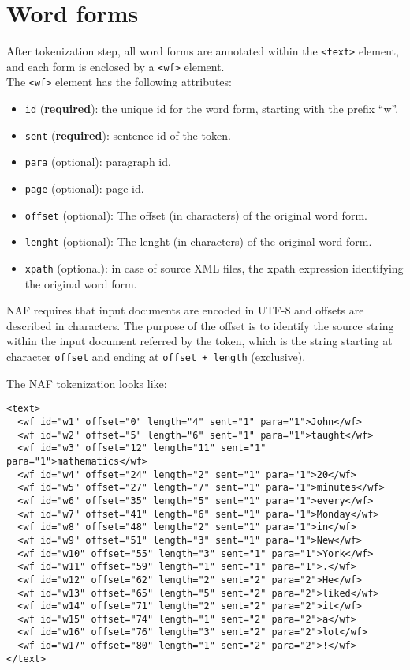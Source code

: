 
\section{Word forms}
\label{sec:word-forms}

After tokenization step, all word forms are annotated within the
\texttt{<text>} element, and each form is enclosed by a \texttt{<wf>}
element.\\

The \texttt{<wf>} element has the following attributes:
\begin{itemize}
\item \texttt{id} (\textbf{required}): the unique id for the word form,
  starting with the prefix ``w''.
\item \texttt{sent} (\textbf{required}): sentence id of the token.
\item \texttt{para} (optional): paragraph id.
\item \texttt{page} (optional): page id.
\item \texttt{offset} (optional): The offset (in characters) of the original
  word form.
\item \texttt{lenght} (optional): The lenght (in characters) of the original
  word form.
\item \texttt{xpath} (optional): in case of source XML files, the xpath
  expression identifying the original word form.
\end{itemize}

NAF requires that input documents are encoded in UTF-8 and offsets are
described in characters. The purpose of the offset is to identify the source
string within the input document referred by the token, which is the string
starting at character \texttt{offset} and ending at \texttt{offset + length}
(exclusive).

The NAF tokenization looks like:
\begin{Verbatim}[fontsize=\small]
<text>
  <wf id="w1" offset="0" length="4" sent="1" para="1">John</wf>
  <wf id="w2" offset="5" length="6" sent="1" para="1">taught</wf>
  <wf id="w3" offset="12" length="11" sent="1" para="1">mathematics</wf>
  <wf id="w4" offset="24" length="2" sent="1" para="1">20</wf>
  <wf id="w5" offset="27" length="7" sent="1" para="1">minutes</wf>
  <wf id="w6" offset="35" length="5" sent="1" para="1">every</wf>
  <wf id="w7" offset="41" length="6" sent="1" para="1">Monday</wf>
  <wf id="w8" offset="48" length="2" sent="1" para="1">in</wf>
  <wf id="w9" offset="51" length="3" sent="1" para="1">New</wf>
  <wf id="w10" offset="55" length="3" sent="1" para="1">York</wf>
  <wf id="w11" offset="59" length="1" sent="1" para="1">.</wf>
  <wf id="w12" offset="62" length="2" sent="2" para="2">He</wf>
  <wf id="w13" offset="65" length="5" sent="2" para="2">liked</wf>
  <wf id="w14" offset="71" length="2" sent="2" para="2">it</wf>
  <wf id="w15" offset="74" length="1" sent="2" para="2">a</wf>
  <wf id="w16" offset="76" length="3" sent="2" para="2">lot</wf>
  <wf id="w17" offset="80" length="1" sent="2" para="2">!</wf>
</text>
\end{Verbatim}


